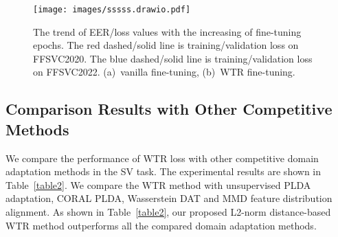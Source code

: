 \documentclass{article}
\begin{document}
\iffalse
We illustrate the loss convergence and EER tendency of the finetuned model in Fig~\ref{fig:trendency}. As we can see, although the loss function is decreasing~(the empirical error of the model is decreasing), the EER of the model is indeed increasing~(the generalization error keeps increasing). The results indicate that it is very easy to overfit during fine-tuning. In addition, the weights of the pre-trained speaker verification model are only used to initialize the fine-tuned model in the first epoch and there are no other constraints during fine-tuning, where the fine-tuned model is prone to forget the discriminative ability learned from large-scale near-field datasets. The analysis further demonstrates that WTR alleviates the overfitting of the model during the fine-tuning process.

Compared with Fig~\ref{fig:trendency}, the value of EER has the same trend. In other words, as the loss function decreases, the value of EER also decreases. 
\fi


\begin{figure}[th]
\centering
\centerline{\texttt{[image: images/sssss.drawio.pdf]}}
\caption{The trend of EER/loss values with the increasing of fine-tuning epochs. The red dashed/solid line is training/validation loss on FFSVC2020. The blue dashed/solid line is training/validation loss on FFSVC2022. (a)~vanilla fine-tuning, (b)~WTR fine-tuning.}
\label{fig:replace}
\vspace{-2em}%
\end{figure}
\subsection{Comparison Results with Other Competitive Methods}
We compare the performance of WTR loss with other competitive domain adaptation methods in the SV task. The experimental results are shown in Table~\ref{table2}. We compare the WTR method with unsupervised PLDA adaptation, CORAL PLDA, Wasserstein DAT and MMD feature distribution alignment. As shown in Table~\ref{table2}, our proposed L2-norm distance-based WTR method outperforms all the compared domain adaptation methods.
\end{document}
